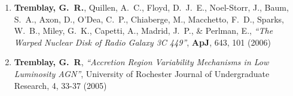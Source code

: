 \documentclass[11pt]{article}
\begin{document}
\begin{enumerate}
\item {\bf Tremblay, G.~R.}, Quillen, A.~C., Floyd, D.~J.~E., Noel-Storr, J., Baum, 
S.~A., Axon, D., O'Dea, C.~P., Chiaberge, M., Macchetto, F.~D., Sparks, 
W.~B., Miley, G.~K., Capetti, A., Madrid, J.~P., 
\& Perlman, E.,   {\it ``The Warped Nuclear Disk of Radio Galaxy 3C 449''}, \textbf{ApJ}, 643,  101 (2006)


\item {\bf Tremblay, G.~R}, {\it ``Accretion Region Variability Mechanisms in Low Luminosity AGN''}, University of Rochester Journal of Undergraduate Research, 4, 33-37 (2005)

\end{enumerate}

\vspace{4mm}

\end{document}
